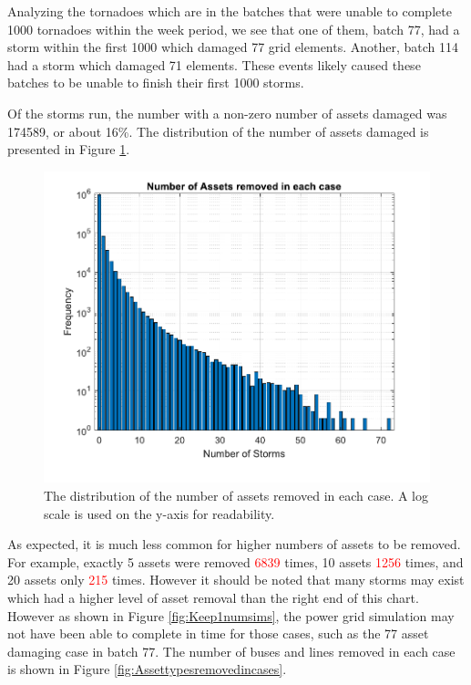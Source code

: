 \documentclass[12pt]{article}
\begin{document}
Analyzing the tornadoes which are in the batches that were unable to complete 1000 tornadoes within the week period, we see that one of them, batch 77, had a storm within the first 1000 which damaged 77 grid elements. Another, batch 114 had a storm which damaged 71 elements. These events likely caused these batches to be unable to finish their first 1000 storms. \par

Of the storms run, the number with a non-zero number of assets damaged was 174589, or about 16\%. The distribution of the number of assets damaged is presented in Figure \ref{fig:Assetsremovedincases}. 

\begin{figure}[H]
    \centering %
    \includegraphics[scale = 0.6]{Assetsremovedincases.pdf}
    \caption[Distribution of assets removed in each case]{The distribution of the number of assets removed in each case. A log scale is used on the y-axis for readability.}
    \label{fig:Assetsremovedincases}
\end{figure}
As expected, it is much less common for higher numbers of assets to be removed. For example, exactly 5 assets were removed \textcolor{red}{6839} times, 10 assets \textcolor{red}{1256} times, and 20 assets only \textcolor{red}{215} times. However it should be noted that many storms may exist which had a higher level of asset removal than the right end of this chart. However as shown in Figure \ref{fig:Keep1numsims}, the power grid simulation may not have been able to complete in time for those cases, such as the 77 asset damaging case in batch 77. The number of buses and lines removed in each case is shown in Figure \ref{fig:Assettypesremovedincases}.
\end{document}
